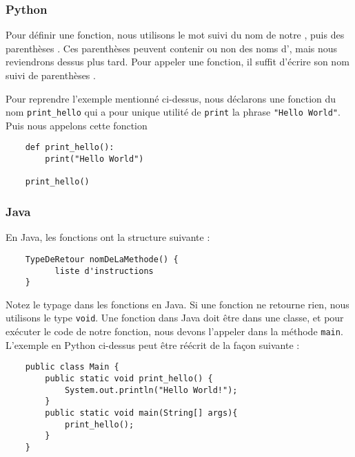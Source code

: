 \subsubsection{Python}
Pour définir une fonction, nous utilisons le mot  suivi du nom de notre , puis des parenthèses \codeword{()}. Ces parenthèses peuvent contenir ou non des noms d', mais nous reviendrons dessus plus tard. Pour appeler une fonction, il suffit d'écrire son nom suivi de parenthèses \codeword{()}.

Pour reprendre l'exemple mentionné ci-dessus, nous déclarons une fonction du nom \lstinline{print_hello} qui a pour unique utilité de \lstinline{print} la phrase \lstinline{"Hello World"}. Puis nous appelons cette fonction \\

\begin{verbatim}
    def print_hello():
        print("Hello World")
        
    print_hello()
\end{verbatim}

\subsubsection{Java}
En Java, les fonctions ont la structure suivante :

\begin{verbatim}
    TypeDeRetour nomDeLaMethode() {
          liste d'instructions
    }
\end{verbatim}

Notez le typage dans les fonctions en Java. Si une fonction ne retourne rien, nous utilisons le type \lstinline{void}. Une fonction dans Java doit être dans une classe, et pour exécuter le code de notre fonction, nous devons l'appeler dans la méthode \lstinline{main}. L'exemple en Python ci-dessus peut être réécrit de la façon suivante :  

\begin{verbatim}
    public class Main {
        public static void print_hello() {
            System.out.println("Hello World!"); 
        }
        public static void main(String[] args){
            print_hello();
        }
    }
\end{verbatim}


